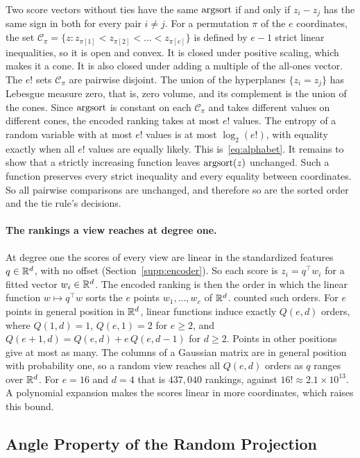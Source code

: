 Two score vectors without ties have the same $\mathrm{argsort}$ if and only if $z_i-z_j$ has the same sign in both for every pair $i\neq j$. For a permutation $\pi$ of the $e$ coordinates, the set $\mathcal{C}_\pi=\{z: z_{\pi[1]}<z_{\pi[2]}<\dots<z_{\pi[e]}\}$ is defined by $e-1$ strict linear inequalities, so it is open and convex. It is closed under positive scaling, which makes it a cone. It is also closed under adding a multiple of the all-ones vector. The $e!$ sets $\mathcal{C}_\pi$ are pairwise disjoint. The union of the hyperplanes $\{z_i=z_j\}$ has Lebesgue measure zero, that is, zero volume, and its complement is the union of the cones. Since $\mathrm{argsort}$ is constant on each $\mathcal{C}_\pi$ and takes different values on different cones, the encoded ranking takes at most $e!$ values. The entropy of a random variable with at most $e!$ values is at most $\log_2(e!)$, with equality exactly when all $e!$ values are equally likely. This is~\eqref{eq:alphabet}. It remains to show that a strictly increasing function leaves $\mathrm{argsort}(z)$ unchanged. Such a function preserves every strict inequality and every equality between coordinates. So all pairwise comparisons are unchanged, and therefore so are the sorted order and the tie rule's decisions.

\paragraph{The rankings a view reaches at degree one.} At degree one the scores of every view are linear in the standardized features $q\in\mathbb{R}^d$, with no offset (Section~\ref{supp:encoder}). So each score is $z_i=q^{\top}w_i$ for a fitted vector $w_i\in\mathbb{R}^d$. The encoded ranking is then the order in which the linear function $w\mapsto q^{\top}w$ sorts the $e$ points $w_1,\dots,w_e$ of $\mathbb{R}^d$. \citet{cover1967orderings} counted such orders. For $e$ points in general position in $\mathbb{R}^d$, linear functions induce exactly $Q(e,d)$ orders, where $Q(1,d)=1$, $Q(e,1)=2$ for $e\ge2$, and $Q(e+1,d)=Q(e,d)+e\,Q(e,d-1)$ for $d\ge2$. Points in other positions give at most as many. The columns of a Gaussian matrix are in general position with probability one, so a random view reaches all $Q(e,d)$ orders as $q$ ranges over $\mathbb{R}^d$. For $e=16$ and $d=4$ that is $437{,}040$ rankings, against $16!\approx2.1\times10^{13}$. A polynomial expansion makes the scores linear in more coordinates, which raises this bound.

\subsection{Angle Property of the Random Projection}\label{supp:angle}

